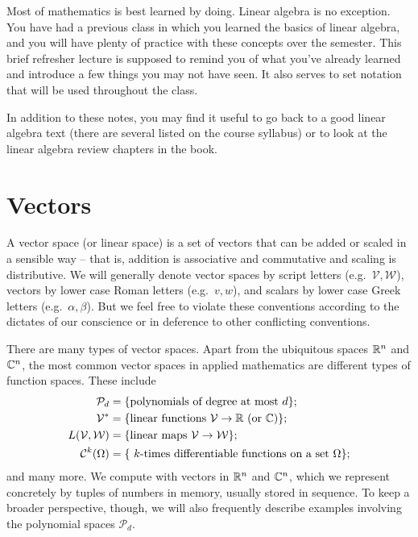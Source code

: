 \documentclass[12pt, leqno]{article} %
\begin{document}

Most of mathematics is best learned by doing.  Linear algebra is no
exception.  You have had a previous class in which you learned the
basics of linear algebra, and you will have plenty of practice with
these concepts over the semester.  This brief refresher lecture is
supposed to remind you of what you've already learned and introduce a
few things you may not have seen.  It also serves to set notation
that will be used throughout the class.

In addition to these notes, you may find it useful to go back to a
good linear algebra text (there are several listed on the course
syllabus) or to look at the linear algebra review chapters in the
book.

\section{Vectors}

A vector space (or linear space) is a set of vectors that can be added
or scaled in a sensible way -- that is, addition is associative and
commutative and scaling is distributive.  We will generally denote
vector spaces by script letters (e.g.~$\mathcal{V}, \mathcal{W}$),
vectors by lower case Roman letters (e.g.~$v, w$), and scalars by
lower case Greek letters (e.g.~$\alpha, \beta$).  But we feel free to
violate these conventions according to the dictates of our conscience
or in deference to other conflicting conventions.

There are many types of vector spaces.  Apart from the ubiquitous
spaces $\mathbb{R}^n$ and $\mathbb{C}^n$, the most common vector spaces in applied
mathematics are different types of function spaces.  These include
\begin{align*}
  \mathcal{P}_d &=
  \{ \mbox{polynomials of degree at most $d$} \}; \\
  \mathcal{V}^* &=
  \{ \mbox{linear functions $\mathcal{V} \rightarrow \mathbb{R}$ (or $\mathbb{C}$)} \}; \\
  L(\mathcal{V}, \mathcal{W}) &=
  \{ \mbox{linear maps $\mathcal{V} \rightarrow \mathcal{W}$} \}; \\
  \mathcal{C}^k(\Omega) &=
  \{\mbox{ $k$-times differentiable functions on a set $\Omega$} \};
\end{align*}
and many more.  We compute with vectors in $\mathbb{R}^n$ and $\mathbb{C}^n$,
which we represent concretely by tuples of numbers in memory, usually
stored in sequence.  To keep a broader perspective, though, we will
also frequently describe examples involving the polynomial spaces
$\mathcal{P}_d$.
\end{document}
